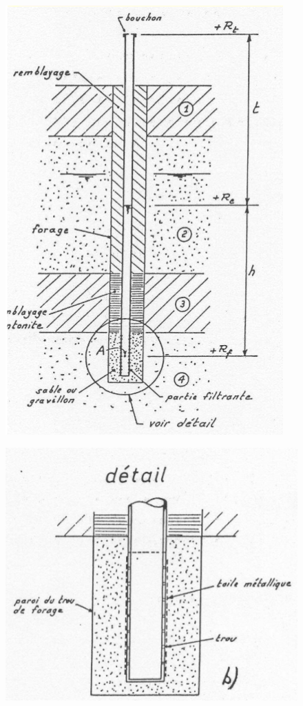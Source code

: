                 \begin{figure}[h!]
                \includegraphics[scale=0.8]{Holeyman/images/H13.PNG}
                \end{figure}
        

                \begin{figure}[h!]
                \includegraphics[scale=1]{Holeyman/images/H14.PNG}
                \end{figure}
            
